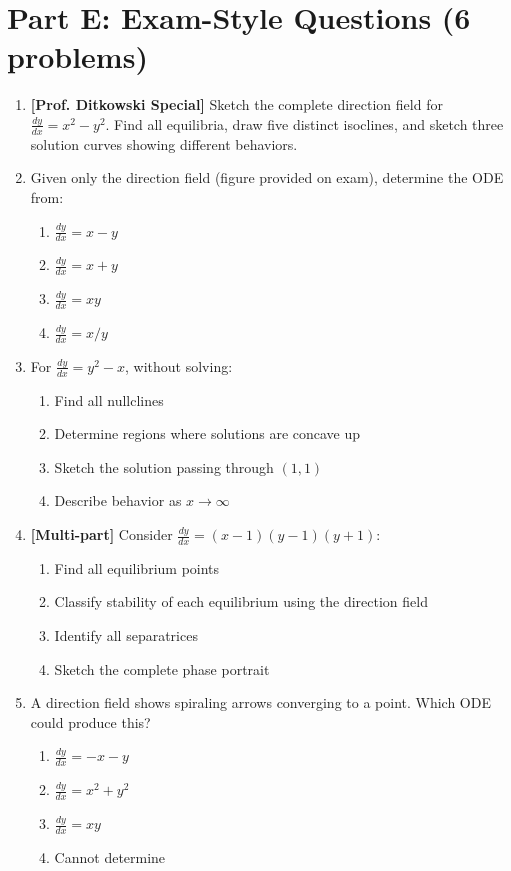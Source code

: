 \documentclass[12pt]{article}
\begin{document}
\section*{Part E: Exam-Style Questions (6 problems)}

\begin{enumerate}[resume]
\item \textbf{[Prof. Ditkowski Special]} Sketch the complete direction field for $\frac{dy}{dx} = x^2 - y^2$. Find all equilibria, draw five distinct isoclines, and sketch three solution curves showing different behaviors.

\item Given only the direction field (figure provided on exam), determine the ODE from:
    \begin{enumerate}[label=\alph*)]
        \item $\frac{dy}{dx} = x - y$
        \item $\frac{dy}{dx} = x + y$
        \item $\frac{dy}{dx} = xy$
        \item $\frac{dy}{dx} = x/y$
    \end{enumerate}

\item For $\frac{dy}{dx} = y^2 - x$, without solving:
    \begin{enumerate}[label=\alph*)]
        \item Find all nullclines
        \item Determine regions where solutions are concave up
        \item Sketch the solution passing through $(1,1)$
        \item Describe behavior as $x \to \infty$
    \end{enumerate}

\item \textbf{[Multi-part]} Consider $\frac{dy}{dx} = (x-1)(y-1)(y+1)$:
    \begin{enumerate}[label=\alph*)]
        \item Find all equilibrium points
        \item Classify stability of each equilibrium using the direction field
        \item Identify all separatrices
        \item Sketch the complete phase portrait
    \end{enumerate}

\item A direction field shows spiraling arrows converging to a point. Which ODE could produce this?
    \begin{enumerate}[label=\alph*)]
        \item $\frac{dy}{dx} = -x - y$
        \item $\frac{dy}{dx} = x^2 + y^2$
        \item $\frac{dy}{dx} = xy$
        \item Cannot determine
    \end{enumerate}


\end{enumerate}
\end{document}
